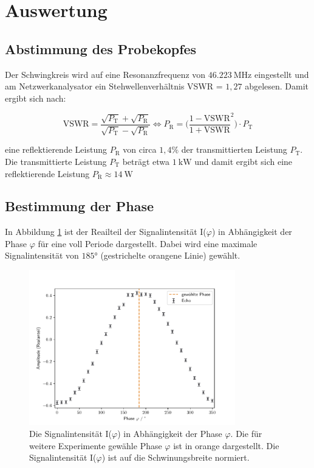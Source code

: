 \section{Auswertung}
\label{sec:Auswertung}

\subsection{Abstimmung des Probekopfes}
\label{sec:Abstimmung}
Der Schwingkreis wird auf eine Resonanzfrequenz von $\SI{46,223}{\mega\hertz}$
eingestellt und am Netzwerkanalysator ein Stehwellenverhältnis VSWR =
$\si{1,27}$ abgelesen. Damit ergibt sich nach:

\begin{equation}
    \text{VSWR} = \frac{\sqrt{P_{\text{T}}} + \sqrt{P_{\text{R}}}}
                {\sqrt{P_{\text{T}}} - \sqrt{P_{\text{R}}}}
    \iff
    P_{\text{R}} = \biggl( \frac{1-\text{VSWR}}{1+\text{VSWR}}^2 \biggr) \cdot P_{\text{T}}
\end{equation}

\noindent
eine reflektierende Leistung $P_{\text{R}}$ von circa $1,4\%$ der transmittierten
Leistung $P_{\text{T}}$. Die transmittierte Leistung $P_{\text{T}}$ beträgt etwa
$\SI{1}{\kilo\watt}$ und damit ergibt sich eine reflektierende Leistung
$P_{\text{R}} \approx \SI{14}{\watt}$

\subsection{Bestimmung der Phase}
\label{sec:phase}
In Abbildung \ref{fig:phase} ist der Reailteil der Signalintensität I($\varphi$) in Abhängigkeit
der Phase $\varphi$ für eine voll Periode dargestellt. Dabei wird eine maximale
Signalintensität von $185°$ (gestrichelte orangene Linie) gewählt.

\begin{figure}[H]
    \centering
    \includegraphics[width=0.8\textwidth]{Auswertung/winkel.pdf}
    \caption{Die Signalintensität I($\varphi$) in Abhängigkeit der Phase $\varphi$.
    Die für weitere Experimente gewähle Phase $\varphi$ ist in orange dargestellt.
    Die Signalintensität I($\varphi$) ist auf die Schwinungsbreite normiert.}
    \label{fig:phase}
\end{figure}

